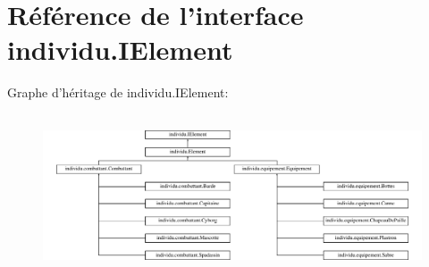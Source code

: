 \hypertarget{interfaceindividu_1_1_i_element}{\section{Référence de l'interface individu.\-I\-Element}
\label{interfaceindividu_1_1_i_element}
}
Graphe d'héritage de individu.\-I\-Element\-:\begin{figure}[H]
\begin{center}
\leavevmode
\includegraphics[height=4.806867cm]{interfaceindividu_1_1_i_element}
\end{center}
\end{figure}
